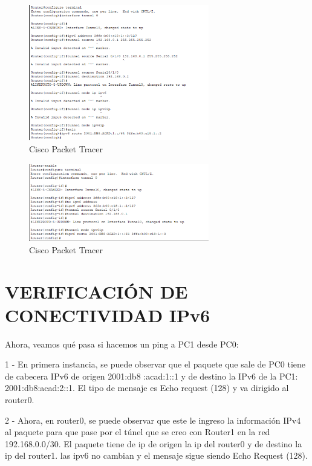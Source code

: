 \documentclass[12pt]{article}
\begin{document}
	\begin{figure}[h!]
		\centering
		\includegraphics[width=0.7\textwidth]{../tpipv6-2/imagenes/conftunnelr0}
		\caption{Cisco Packet Tracer}
	\end{figure}
	
	\begin{figure}[h!]
		\centering
		\includegraphics[width=0.7\textwidth]{../tpipv6-2/imagenes/conftunnelr1}
		\caption{Cisco Packet Tracer}
	\end{figure}
	
	\newpage
	
	\section{VERIFICACIÓN DE CONECTIVIDAD IPv6}
	{\large Ahora, veamos qué pasa si hacemos un ping a PC1 desde PC0:
	}
	
	{\large 1 -  En primera instancia, se puede observar que el paquete que sale de PC0 tiene de cabecera IPv6 de origen 2001:db8 :acad:1::1 y de destino la  IPv6 de la PC1: 2001:db8:acad:2::1. El tipo de mensaje es Echo request (128) y va dirigido al router0.}
	
	{\large 2 - Ahora, en router0, se puede observar que este le ingreso la información IPv4 al paquete para que pase por el túnel que se creo con Router1 en la red 192.168.0.0/30. El paquete tiene de ip de origen la ip del router0 y de destino la ip del router1. las ipv6 no cambian y el mensaje sigue siendo Echo Request (128).}
	
\end{document}
